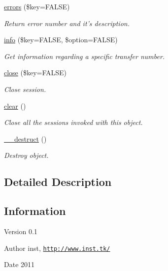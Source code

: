 \begin{DoxyCompactItemize}
\hyperlink{a00002_a58091a18a0bdccb39945a7b64130656d}{errors} (\$key=FALSE)
\begin{DoxyCompactList}\small\item\em Return error number and it's description. \item\end{DoxyCompactList}\item 
\hyperlink{a00002_ac81de18f56fe9fe2cfe5f06325feff61}{info} (\$key=FALSE, \$option=FALSE)
\begin{DoxyCompactList}\small\item\em Get information regarding a specific transfer number. \item\end{DoxyCompactList}\item 
\hyperlink{a00002_a464afe86dc5418c7f673742e85d6e109}{close} (\$key=FALSE)
\begin{DoxyCompactList}\small\item\em Close session. \item\end{DoxyCompactList}\item 
\hyperlink{a00002_ae943dff49900fb46e5cb89bd3a9959ae}{clear} ()
\begin{DoxyCompactList}\small\item\em Close all the sessions invoked with this object. \item\end{DoxyCompactList}\item 
\hyperlink{a00002_ab1c247c6f8bfc35984325e6b40eb45a8}{\_\-\_\-destruct} ()
\begin{DoxyCompactList}\small\item\em Destroy object. \item\end{DoxyCompactList}\end{DoxyCompactItemize}


\subsection{Detailed Description}
\hypertarget{a00002_Information}{}\subsection{Information}\label{a00002_Information}
\begin{DoxyVersion}{Version}
0.1 
\end{DoxyVersion}
\begin{DoxyAuthor}{Author}
inst, \href{http://www.inst.tk/}{\tt http://www.inst.tk/} 
\end{DoxyAuthor}
\begin{DoxyDate}{Date}
2011 
\end{DoxyDate}


